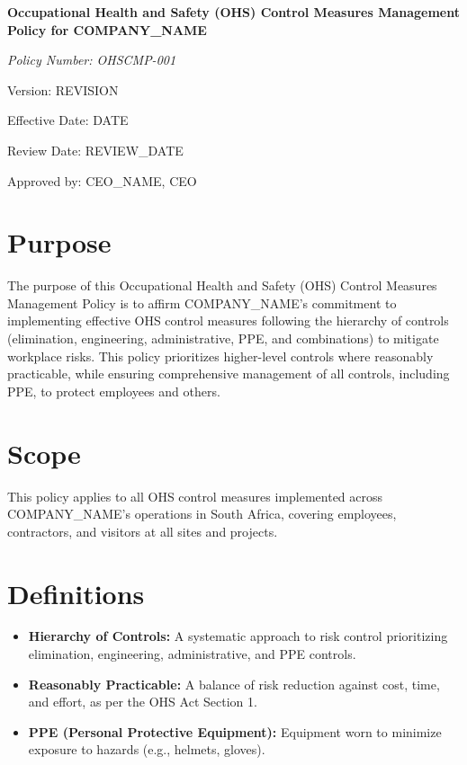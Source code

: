 \documentclass[12pt]{article}
\begin{document}
\begin{titlepage}
    \centering
    \vspace*{2cm}
    {\LARGE\bfseries Occupational Health and Safety (OHS) Control Measures Management Policy for {{COMPANY_NAME}}\par}
    \vspace{1cm}
    {\large\itshape Policy Number: OHSCMP-001\par}
    \vspace{0.5cm}
    {\normalsize Version: {{REVISION}}\par}
    \vspace{0.5cm}
    {\normalsize Effective Date: {{DATE}}\par}
    \vspace{0.5cm}
    {\normalsize Review Date: {{REVIEW_DATE}}\par}
    \vspace{2cm}
    {\normalsize Approved by: {{CEO_NAME}}, CEO\par}
\end{titlepage}

\section{Purpose}
The purpose of this Occupational Health and Safety (OHS) Control Measures Management Policy is to affirm {{COMPANY_NAME}}'s commitment to implementing effective OHS control measures following the hierarchy of controls (elimination, engineering, administrative, PPE, and combinations) to mitigate workplace risks. This policy prioritizes higher-level controls where reasonably practicable, while ensuring comprehensive management of all controls, including PPE, to protect employees and others.

\section{Scope}
This policy applies to all OHS control measures implemented across {{COMPANY_NAME}}’s operations in South Africa, covering employees, contractors, and visitors at all sites and projects.

\section{Definitions}
\begin{itemize}
    \item \textbf{Hierarchy of Controls:} A systematic approach to risk control prioritizing elimination, engineering, administrative, and PPE controls.
    \item \textbf{Reasonably Practicable:} A balance of risk reduction against cost, time, and effort, as per the OHS Act Section 1.
    \item \textbf{PPE (Personal Protective Equipment):} Equipment worn to minimize exposure to hazards (e.g., helmets, gloves).
\end{itemize}
\end{document}
